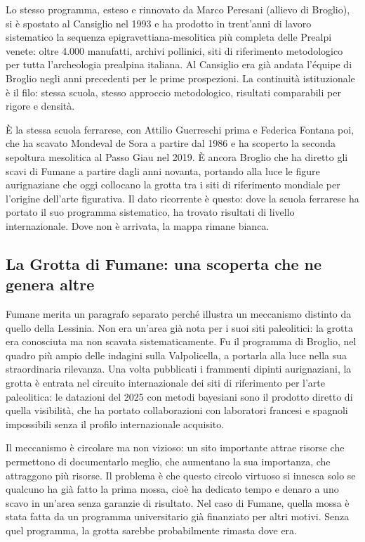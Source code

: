 Lo stesso programma, esteso e rinnovato da Marco Peresani (allievo di Broglio), si è spostato al Cansiglio nel 1993 e ha prodotto in trent'anni di lavoro sistematico la sequenza epigravettiana-mesolitica più completa delle Prealpi venete: oltre 4.000 manufatti, archivi pollinici, siti di riferimento metodologico per tutta l'archeologia prealpina italiana. Al Cansiglio era già andata l'équipe di Broglio negli anni precedenti per le prime prospezioni. La continuità istituzionale è il filo: stessa scuola, stesso approccio metodologico, risultati comparabili per rigore e densità.

È la stessa scuola ferrarese, con Attilio Guerreschi prima e Federica Fontana poi, che ha scavato Mondeval de Sora a partire dal 1986 e ha scoperto la seconda sepoltura mesolitica al Passo Giau nel 2019. È ancora Broglio che ha diretto gli scavi di Fumane a partire dagli anni novanta, portando alla luce le figure aurignaziane che oggi collocano la grotta tra i siti di riferimento mondiale per l'origine dell'arte figurativa. Il dato ricorrente è questo: dove la scuola ferrarese ha portato il suo programma sistematico, ha trovato risultati di livello internazionale. Dove non è arrivata, la mappa rimane bianca.

\subsection{La Grotta di Fumane: una scoperta che ne genera altre}

Fumane merita un paragrafo separato perché illustra un meccanismo distinto da quello della Lessinia. Non era un'area già nota per i suoi siti paleolitici: la grotta era conosciuta ma non scavata sistematicamente. Fu il programma di Broglio, nel quadro più ampio delle indagini sulla Valpolicella, a portarla alla luce nella sua straordinaria rilevanza. Una volta pubblicati i frammenti dipinti aurignaziani, la grotta è entrata nel circuito internazionale dei siti di riferimento per l'arte paleolitica: le datazioni del 2025 con metodi bayesiani sono il prodotto diretto di quella visibilità, che ha portato collaborazioni con laboratori francesi e spagnoli impossibili senza il profilo internazionale acquisito.

Il meccanismo è circolare ma non vizioso: un sito importante attrae risorse che permettono di documentarlo meglio, che aumentano la sua importanza, che attraggono più risorse. Il problema è che questo circolo virtuoso si innesca solo se qualcuno ha già fatto la prima mossa, cioè ha dedicato tempo e denaro a uno scavo in un'area senza garanzie di risultato. Nel caso di Fumane, quella mossa è stata fatta da un programma universitario già finanziato per altri motivi. Senza quel programma, la grotta sarebbe probabilmente rimasta dove era.

